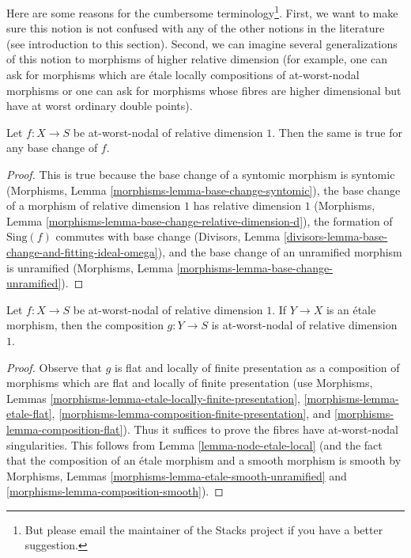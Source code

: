 \noindent
Here are some reasons for the cumbersome terminology\footnote{But please
email the maintainer of the Stacks project if you have a better suggestion.}.
First, we want to make sure this notion is not confused with any of the
other notions in the literature (see introduction to this section).
Second, we can imagine several generalizations of this notion to morphisms
of higher relative dimension (for example, one can ask for morphisms
which are \'etale locally compositions of at-worst-nodal morphisms or
one can ask for morphisms whose fibres are higher dimensional but have
at worst ordinary double points).

\begin{lemma}
\label{lemma-base-change-nodal-family}
Let $f : X \to S$ be at-worst-nodal of relative dimension $1$.
Then the same is true for any base change of $f$.
\end{lemma}

\begin{proof}
This is true because the base change of a syntomic morphism
is syntomic (Morphisms, Lemma \ref{morphisms-lemma-base-change-syntomic}),
the base change of a morphism of relative dimension $1$ has
relative dimension $1$
(Morphisms, Lemma \ref{morphisms-lemma-base-change-relative-dimension-d}),
the formation of $\text{Sing}(f)$ commutes with base change
(Divisors, Lemma
\ref{divisors-lemma-base-change-and-fitting-ideal-omega}), and
the base change of an unramified morphism is unramified
(Morphisms, Lemma \ref{morphisms-lemma-base-change-unramified}).
\end{proof}

\begin{lemma}
\label{lemma-nodal-family-precompose-etale}
Let $f : X \to S$ be at-worst-nodal of relative dimension $1$.
If $Y \to X$ is an \'etale morphism, then the composition $g : Y \to S$
is at-worst-nodal of relative dimension $1$.
\end{lemma}

\begin{proof}
Observe that $g$ is flat and locally of finite presentation as
a composition of morphisms which are flat and locally of finite
presentation (use
Morphisms, Lemmas \ref{morphisms-lemma-etale-locally-finite-presentation},
\ref{morphisms-lemma-etale-flat},
\ref{morphisms-lemma-composition-finite-presentation}, and
\ref{morphisms-lemma-composition-flat}).
Thus it suffices to prove the fibres have at-worst-nodal singularities.
This follows from Lemma \ref{lemma-node-etale-local}
(and the fact that the composition of an \'etale morphism and
a smooth morphism is smooth by
Morphisms, Lemmas \ref{morphisms-lemma-etale-smooth-unramified} and
\ref{morphisms-lemma-composition-smooth}).
\end{proof}


